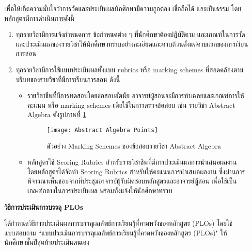 
เพื่อให้เกิดความมั่นใจว่าการวัดและประเมินผลนักศึกษามีความถูกต้อง เชื่อถือได้ และเป็นธรรม โดยหลักสูตรมีการดำเนินการดังนี้ 
\begin{enumerate}
\item ทุกรายวิชามีการแจ้งกำหนดการ ข้อกำหนดต่าง ๆ ที่นักศึกษาต้องปฏิบัติตาม และเกณฑ์ในการวัดและประเมินผลของรายวิชาให้นักศึกษาทราบอย่างละเอียดและครบถ้วนตั้งแต่คาบแรกของการเรียนการสอน
\item ทุกรายวิชามีการใช้แบบประเมินผลทั้งแบบ rubrics หรือ marking schemes ที่สอดคล้องตามบริบทของรายวิชาที่มีการเรียนการสอน ดังนี้

\begin{itemize}
	\item[2.1] รายวิชาชีพที่มีการทดสอบโดยข้อสอบอัตนัย อาจารย์ผู้สอนจะมีการทำเฉลยและเกณฑ์การให้คะแนน หรือ marking schemes เพื่อใช้ในการตรวจข้อสอบ เช่น รายวิชา Abstract Algebra ดังรูปภาพที่ \ref{Picture:Marking Schemes}
	\begin{figure}[h!]
		\texttt{[image: Abstract Algebra Points]}\\
		\caption{ตัวอย่าง Marking Schemes ของข้อสอบรายวิชา Abstract Algebra  }
		\label{Picture:Marking Schemes}
	\end{figure}
\newpage
	\item[2.2] 
	หลักสูตรใช้ Scoring Rubrics สำหรับรายวิชาชีพที่มีการประเมินผลการนำเสนอผลงาน โดยหลักสูตรได้จัดทำ Scoring Rubrics สำหรับให้คะแนนการนำเสนอผลงาน ซึ่งผ่านการพิจารณาเห็นชอบจากที่ประชุมอาจารย์ผู้รับผิดชอบหลักสูตรและอาจารย์ผู้สอน เพื่อใช้เป็นเกณฑ์กลางในการประเมินผล พร้อมทั้งแจ้งให้นักศึกษาทราบ
\end{itemize}
\end{enumerate}


\begin{doclist}
\end{doclist}

\noindent
{\bf วิธีการประเมินการบรรลุ PLOs}

\printprogram{} ได้กำหนดวิธีการประเมินผลการบรรลุผลลัพธ์การเรียนรู้ที่คาดหวังของหลักสูตร  (PLOs) โดยใช้แบบสอบถาม ``แบบประเมินการบรรลุผลลัพธ์การเรียนรู้ที่คาดหวังของหลักสูตร (PLOs)"  ให้นักศึกษาชั้นปีสุดท้ายประเมินตนเอง

